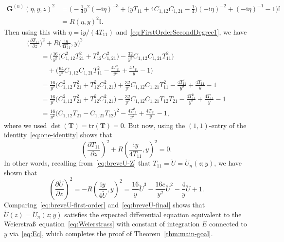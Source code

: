 \documentclass[11pt]{article}
\numberwithin{equation}{section}
\numberwithin{equation}{section}
\begin{document}
\begin{align*}
\mathbf{G}^{(n)}(\eta,y,z)^2 &{}= \bigl(-\tfrac{1}{4}y^2(-\mathrm{i}\eta)^{-3} + \bigl(yT_{11}+4C_{1,12}C_{1,21}-\tfrac{1}{4}\bigr)(-\mathrm{i}\eta)^{-2}+(-\mathrm{i}\eta)^{-1}-1\bigr)\mathbb{I} \\
&{}=R(\eta,y)^2\mathbb{I}.
\end{align*}
Then using this with $\eta=\mathrm{i} y/(4T_{11})$ and~\eqref{eq:FirstOrderSecondDegree1}, we have
\begin{gather*}
\bigg(\frac{\partial T_{11}}{\partial z}\bigg)^2+R\bigg(\frac{\mathrm{i} y}{4T_{11}},y\bigg)^2\\
\qquad {} =
\bigg(\frac{16}{y^2}\bigl(C_{1,12}^2T_{21}^2+T_{12}^2C_{1,21}^2\bigr)-\frac{32}{y^2}C_{1,12}C_{1,21}T_{11}^2\bigg) \\
\qquad\quad {}
 +\bigg(\frac{64}{y^2}C_{1,12}C_{1,21}T_{11}^2-\frac{4T_{11}^2}{y^2}+\frac{4T_{11}}{y}-1\bigg)\\
\qquad{} = \frac{16}{y^2}\bigl(C_{1,12}^2T_{21}^2+T_{12}^2C_{1,21}^2\bigr)+\frac{32}{y^2}C_{1,12}C_{1,21}T_{11}^2 -\frac{4T_{11}^2}{y^2}+\frac{4T_{11}}{y}-1\\
\qquad{} = \frac{16}{y^2}\bigl(C_{1,12}^2T_{21}^2+T_{12}^2C_{1,21}^2\bigr)-\frac{32}{y^2}C_{1,12}C_{1,21}T_{12}T_{21}
 -\frac{4T_{11}^2}{y^2}+\frac{4T_{11}}{y}-1\\
\qquad{} = \frac{16}{y^2}\bigl(C_{1,12}T_{21}-C_{1,21}T_{12}\bigr)^2-\frac{4T_{11}^2}{y^2}+\frac{4T_{11}}{y}-1,
\end{gather*}
where we used $\det(\mathbf{T})=\mathrm{tr}(\mathbf{T})=0$. But now, using the $(1,1)$-entry of the identity~\eqref{eq:one-identity} shows that
\begin{equation*}
\left(\frac{\partial T_{11}}{\partial z}\right)^2+R\left(\frac{\mathrm{i} y}{4T_{11}},y\right)^2=0.
\end{equation*}
In other words, recalling from~\eqref{eq:breveU-Z} that $T_{11}=\breve{U}=\breve{U}_n(z;y)$, we have shown that
\begin{equation}
\left(\frac{\partial\breve{U}}{\partial z}\right)^2=-R\left(\frac{\mathrm{i} y}{4\breve{U}},y\right)^2 = \frac{16}{y}\breve{U}^3-\frac{16c}{y^2}\breve{U}^2-\frac{4}{y}\breve{U}+1.
\label{eq:breveU-final}
\end{equation}
Comparing~\eqref{eq:breveU-first-order} and~\eqref{eq:breveU-final} shows that $\breve{U}(z)=\breve{U}_n(z;y)$ satisfies the expected differential equation equivalent to the Weierstra\ss\ equation~\eqref{eq:Weierstrass} with constant of integration $E$ connected to $y$ via~\eqref{eq:Ec},
which completes the proof of Theorem~\ref{thm:main-goal}.
\end{document}
